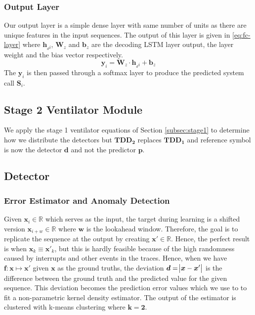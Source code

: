 \subsubsection*{Output Layer}
\label{subsubsec:decoder}
Our output layer is a simple dense layer with same number of units as there are 
unique features in the input sequences. The output of this layer is given in 
\eqref{eq:fc-layer} where $ \bm{h}_{_di} $, $ \bm{W}_z $ and $ \bm{b}_z $ are 
the decoding LSTM layer output, the layer weight and the bias vector 
respectively. 
\begin{equation}
\label{eq:fc-layer}
\bm{y}_i = \bm{W}_{z} \cdot \bm{h}_{_di} + \bm{b}_z
\end{equation}
The $ \bm{y}_i $ is then passed through a softmax layer to produce the 
predicted system call $ \mathbf{S}_i $. 


\subsection{Stage 2 Ventilator Module}
\label{subsec:stage2}
We apply the stage 1 ventilator equations of Section \ref{subsec:stage1} to 
determine how we distribute the detectors but $ \bm{TDD_2} $ replaces $ 
\bm{TDD_1} $ and reference symbol is now the detector $ \bm{d} $ and not the 
predictor $ \bm{p} $. 
\subsection{Detector}
\label{subsec:detector}
\subsubsection*{Error Estimator and Anomaly Detection}
\label{subsec:error-model}
Given $ \bm{x}_i \in \bm{\mathbb{R}} $ which serves as the input, the target 
during learning is a shifted version $ \bm{x}_{i+w} \in \bm{\mathbb{R}} $ where 
$ \bm{w} $ is the lookahead window. Therefore, the goal is to replicate the 
sequence at the output by creating $ \bm{x}' \in \bm{\mathbb{R}}$. Hence, the 
perfect result is when $\bm{x}_k  \equiv \bm{x}'_k $, but this is hardly 
feasible because of the high randomness caused by interrupts and other events 
in the traces. Hence, when we have $ \bm{f}:\bm{x}\longmapsto \bm{x}' $ given $ 
\bm{x} $ as the ground truths, the deviation $ \bm{d} = \abs{\bm{x} - \bm{x}'} 
$ is the difference between the ground truth and the predicted value for the 
given sequence. This deviation becomes the prediction error values which we use 
to to fit a non-parametric kernel density estimator. The output of the 
estimator is clustered with k-means clustering where $ \bm{k=2} $.


